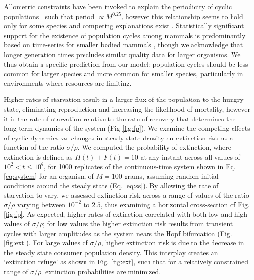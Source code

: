 \documentclass{pnastwo}
\begin{document}
\begin{article}
Allometric constraints have been invoked to explain the periodicity of cyclic populations \cite{CalderIII:1983jd,Peterson:1984hj,Krukonis:1991fk}, such that period $\propto M^{0.25}$, however this relationship seems to hold only for some species \cite{Hendriks:2012fc} and competing explanations exist \cite{Kendall:1999iy,Hogstedt:2005cr}.
Statistically significant support for the existence of population cycles among mammals is predominantly based on time-series for smaller bodied mammals \cite{Kendall:1998hl}, though we acknowledge that longer generation times precludes similar quality data for larger organisms.
We thus obtain a specific prediction from our model: population cycles should be less common for larger species and more common for smaller species, particularly in environments where resources are limiting. %




Higher rates of starvation result in a larger flux of the population to the hungry state, eliminating reproduction and increasing the likelihood of mortality, however it is the rate of starvation relative to the rate of recovery that determines the long-term dynamics of the system (Fig \ref{fig:fp}).
We examine the competing effects of cyclic dynamics vs. changes in steady state density on extinction risk as a function of the ratio $\sigma/\rho$.
We computed the probability of extinction, where extinction is defined as $H(t)+F(t)=10$ at any instant across all values of $10^2<t\leq 10^6$, for 1000 replicates of the continuous-time system shown in Eq. \ref{eq:system} for an organism of $M=100$ grams, assuming random initial conditions around the steady state (Eq. \ref{eq:ss}). %
By allowing the rate of starvation to vary, we assessed extinction risk across a range of values of the ratio $\sigma/\rho$ varying between $10^{-2}$ to $2.5$, thus examining a horizontal cross-section of Fig. \ref{fig:fp}.
As expected, higher rates of extinction correlated with both low and high values of $\sigma/\rho$; for low values the higher extinction risk results from transient cycles with larger amplitudes as the system nears the Hopf bifurcation (Fig. \ref{fig:ext}).
For large values of $\sigma/\rho$, higher extinction risk is due to the decrease in the steady state consumer population density.
This interplay creates an `extinction refuge' as shown in Fig. \ref{fig:ext}, such that for a relatively constrained range of $\sigma/\rho$, extinction probabilities are minimized.


\end{article}
\end{document}
